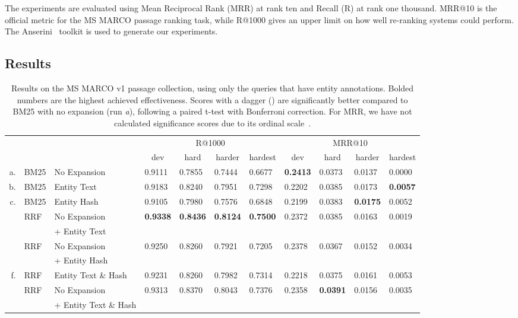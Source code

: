 The experiments are evaluated using Mean Reciprocal Rank (MRR) at rank ten and Recall (R) at rank one thousand. MRR@10 is the official metric for the MS MARCO passage ranking task, while R@1000 gives an upper limit on how well re-ranking systems could perform. The Anserini~\citep{anserini} toolkit is used to generate our experiments. 

\subsection{Results}

\begin{table}
		\centering
		\caption{Results on the MS MARCO v1 passage collection, using only the queries that have entity annotations. Bolded numbers are the highest achieved effectiveness. Scores with a dagger (\dag) are significantly better compared to BM25 with no expansion (run \emph{a}), following a paired t-test with Bonferroni correction. For MRR, we have not calculated significance scores due to its ordinal scale~\citep{fuhr-mrr}.}
		\tabcolsep=0.11cm
		\begin{tabular}{rll|llll|llll}
			\toprule
			\multirow{2}{*}{}
			& & & \multicolumn{4}{c|}{R@1000} & \multicolumn{4}{c}{MRR@10} \\
			& & & \multicolumn{1}{c}{dev} & \multicolumn{1}{c}{hard} & \multicolumn{1}{c}{harder} & \multicolumn{1}{c|}{hardest} & \multicolumn{1}{c}{dev} & \multicolumn{1}{c}{hard} & \multicolumn{1}{c}{harder} & \multicolumn{1}{c}{hardest} \\
			\midrule
			a. & BM25 & No Expansion                       & 0.9111 & 0.7855 & 0.7444 & 0.6677 & \textbf{0.2413} & 0.0373 & 0.0137 & 0.0000 \\
			b. & BM25 & Entity Text                        & 0.9183 & 0.8240\dag & 0.7951\dag & 0.7298\dag & 0.2202 & 0.0385 & 0.0173 & \textbf{0.0057} \\
			c. & BM25 & Entity Hash                        & 0.9105 & 0.7980 & 0.7576 & 0.6848 & 0.2199 & 0.0383 & \textbf{0.0175} & 0.0052 \\ \midrule
			\multirow{2}{*}{}
			d. & RRF & No Expansion          & \textbf{0.9338}\dag & \textbf{0.8436}\dag & \textbf{0.8124}\dag & \textbf{0.7500}\dag & 0.2372 & 0.0385 & 0.0163 & 0.0019 \\
			& & + Entity Text &&&&&&&& \\
			\multirow{2}{*}{}
			e. & RRF &  No Expansion     & 0.9250\dag & 0.8260\dag & 0.7921\dag & 0.7205\dag & 0.2378 & 0.0367 & 0.0152 & 0.0034 \\
			&&  + Entity Hash  &&&&&&&& \\
			f. & RRF & Entity Text \& Hash                 & 0.9231 & 0.8260\dag & 0.7982\dag & 0.7314\dag & 0.2218 & 0.0375 & 0.0161 & 0.0053 \\
			\multirow{2}{*}{}
			g. & RRF & No Expansion   & 0.9313\dag & 0.8370\dag & 0.8043\dag & 0.7376\dag & 0.2358 & \textbf{0.0391} & 0.0156 & 0.0035 \\
			&& + Entity Text \& Hash &&&&&&&& \\
			\bottomrule 
		\end{tabular}
		\label{tab:results-table}
\end{table}

